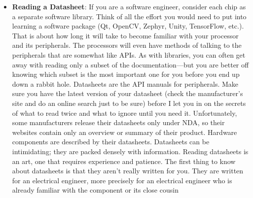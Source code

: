 \documentclass{report}
\begin{document}
\begin{itemize}
            \bigbreak \noindent 
            The board you receive may or may not be full of bugs. Electrical engineers don’t have an opportunity to compile their code, try it out, make a change, and recompile. Making a board is not a process with lots of iterations. Remember that people make mistakes, and the more fluffheaded the mistake, the more likely it will take an eternity to find and fix
            \bigbreak \noindent 
            To make bring-up easier on both yourself and your hardware engineer, first make each component individually testable. If you don’t have enough code space, make another software subproject for the hardware test code (but share the underlying modules as much as possible).
            \bigbreak \noindent 
            Second, when you get the PCBA, start on the lowest-level pieces, at the smallest steps possible. For example, don’t try out your fancy motor controller software. Instead, set an I/O device to go on for a short time, and hook up an LED to make sure it flashes. Then (still taking things one step at a time), do the minimum necessary to make sure the motor moves (or at least twitches).
        \item \textbf{Reading a Datasheet}:  If you are a software engineer, consider each chip as a separate software library. Think of all the effort you would need to put into learning a software package (Qt, OpenCV, Zephyr, Unity, TensorFlow, etc.). That is about how long it will take to become familiar with your processor and its peripherals. The processors will even have methods of talking to the peripherals that are somewhat like APIs. As with libraries, you can often get away with reading only a subset of the documentation—but you are better off knowing which subset is the most important one for you before you end up down a rabbit hole.
            \bigbreak \noindent 
            Datasheets are the API manuals for peripherals. Make sure you have the latest version of your datasheet (check the manufacturer’s site and do an online search just to be sure) before I let you in on the secrets of what to read twice and what to ignore until you need it.
            \bigbreak \noindent 
            Unfortunately, some manufacturers release their datasheets only under NDA, so their websites contain only an overview or summary of their product.
            \bigbreak \noindent 
            Hardware components are described by their datasheets. Datasheets can be intimidating; they are packed densely with information. Reading datasheets is an art, one that requires experience and patience. The first thing to know about datasheets is that they aren’t really written for you. They are written for an electrical engineer, more precisely for an electrical engineer who is already familiar with the component or its close cousin

\end{itemize}
\end{document}
